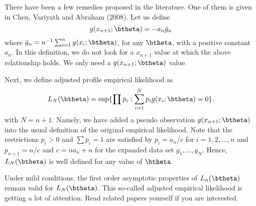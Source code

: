 There have been a few remedies proposed in the literature.
One of them is given in Chen, Variyath and Abraham (2008). 
Let us define
\[
g(x_{n+1}; \btheta) = - a_n \bar g_n
\]
where $\bar g_n = n^{-1} \sum_{i=1}^n g(x_i; \btheta)$,
for any $\btheta$, with a positive constant $a_n$. 
In this definition, we do not look for a $x_{n+1}$ value at which
the above relationship holds. We only need a $g(x_{n+1}; \btheta)$ value.

Next, we define adjusted profile empirical likelihood as
\[
L_N(\btheta) = \sup \{ \prod p_i : \sum_{i=1}^N p_i g(x_i; \btheta) = 0\}.
\]
with $N = n+1$. Namely, we have added a pseudo observation
$g(x_{n+1}; \btheta)$ into the usual definition of the original empirical
likelihood.
Note that the restrictions $p_i > 0$ and $\sum p_i = 1$
are satisfied by  $ p_i = a_n /c$ for $i=1, 2, \ldots, n$ and $ p_{n+1} = n/c$
and $c = n a_n + n$ for the expanded data set $g_1, \ldots, g_N$.
Hence, $L_N(\btheta) $ is well defined for any value of $\btheta$.

Under mild conditions, the first order asymptotic properties of
$L_n(\btheta)$ remain valid for $L_N(\btheta)$.
This so-called adjusted empirical likelihood is getting a lot
of attention. Read related papers yourself if you are interested.

